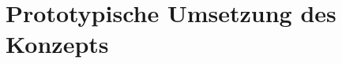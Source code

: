 \chapter{Prototypische Umsetzung des Konzepts}
\label{ch:06_prototypical-implementation-of-the-concept}





